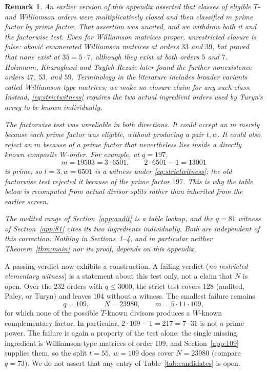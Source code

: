 \documentclass[11pt]{article}
\newtheorem{remark}{Remark}
\begin{document}
\begin{remark}\label{rem:mult}
An earlier version of this appendix asserted that classes of eligible
\(T\)- and Williamson orders were multiplicatively closed and then
classified \(m\) prime factor by prime factor.  That assertion was uncited,
and we withdraw both it and the factorwise test.  Even for Williamson
matrices proper, unrestricted closure is false:
\DJ okovi\'c \cite{Djokovic1993} enumerated Williamson matrices at orders
\(33\) and \(39\), but proved that none exist at
\(35=5\cdot7\), although they exist at both orders \(5\) and \(7\).
Holzmann, Kharaghani and Tayfeh-Rezaie
\cite{HolzmannKharaghaniTayfehRezaie2008} later found the further
nonexistence orders \(47\), \(53\), and \(59\).  Terminology in the
literature includes broader variants called Williamson-type matrices;
we make no closure claim for any such class.  Instead,
\eqref{eq:strictwitness} requires the two actual ingredient orders used
by Turyn's array to be known individually.

The factorwise test was unreliable in both directions.  It could accept
an \(m\) merely because each prime factor was eligible, without producing
a pair \(t,w\).  It could also reject an \(m\) because of a prime factor
that nevertheless lies inside a directly known composite \(W\)-order.
For example, at \(q=197\),
\[
        m=19503=3\cdot6501,\qquad 2\cdot6501-1=13001
\]
is prime, so \(t=3,w=6501\) is a witness under
\eqref{eq:strictwitness}; the old factorwise test rejected it because of
the prime factor \(197\).  This is why the table below is recomputed from
actual divisor splits rather than inherited from the earlier screen.

The audited range of Section~\ref{app:audit} is a table lookup, and the
\(q=81\) witness of Section~\ref{app:81} cites its two ingredients
individually.  Both are independent of this correction.  Nothing in
Sections~1--4, and in particular neither Theorem~\ref{thm:main} nor its proof,
depends on this appendix.
\end{remark}

A passing verdict now exhibits a construction.  A failing verdict
(\emph{no restricted elementary witness}) is a statement about this test
only, not a claim that \(N\) is open.  Over the \(232\) orders with
\(q\le3000\), the strict test covers \(128\) (audited, Paley, or Turyn)
and leaves \(104\) without a witness.  The smallest failure remains
\[
        q=109,\qquad N=23980,\qquad m=5\cdot11\cdot109,
\]
for which none of the possible \(T\)-known divisors produces a
\(W\)-known complementary factor.  In particular,
\(2\cdot109-1=217=7\cdot31\) is not a prime power.  The failure is
again a property of the test alone: the single missing ingredient is
Williamson-type matrices of order \(109\), and Section~\ref{app:109} supplies
them, so the split \(t=55,\ w=109\) does cover \(N=23980\) (compare
\(q=73\)).  We do not assert that any entry of
Table~\ref{tab:candidates} is open.
\end{document}

